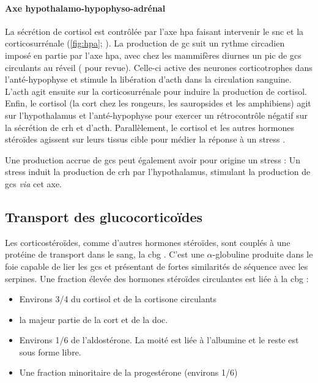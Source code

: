 \documentclass[../main.tex]{subfiles}
\begin{document}
\paragraph[Axe hypothalamo-hypophyso-adrénal]{Axe hypothalamo-hypophyso-adrénal}
La sécrétion de cortisol est contrôlée par l'axe \gls{hpa} faisant intervenir le \gls{snc} et la corticosurrénale (\autoref{fig:hpa}; \citealp{Herman1997}).
La production de \gls{gc} suit un rythme circadien imposé en partie par l'axe \gls{hpa}, avec chez les mammifères diurnes un pic de \glspl{gc} circulants au réveil (\citealp{Dickmeis2009} pour revue).
Celle-ci active des neurones corticotrophes dans l'anté-hypophyse et stimule la libération d'\gls{acth} dans la circulation sanguine.
L'\gls{acth} agit ensuite sur la corticosurrénale pour induire la production de cortisol.
Enfin, le cortisol (la \gls{cort} chez les rongeurs, les sauropsides et les amphibiens) agit sur l'hypothalamus et l'anté-hypophyse pour exercer un rétrocontrôle négatif sur la sécrétion de \gls{crh} et d'\gls{acth}.
Parallèlement, le cortisol et les autres hormones stéroïdes agissent sur leurs tissus cible pour médier la réponse à un stress \citep{Herman1997,Tsigos2002}.
\par
Une production accrue de \glspl{gc} peut également avoir pour origine un stress :
Un stress induit la production de \gls{crh} par l'hypothalamus, stimulant la production de \glspl{gc} \textit{via} cet axe.




\subsection{Transport des glucocorticoïdes}
Les corticostéroïdes, comme d'autres hormones stéroïdes, sont couplés à une protéine de transport dans le sang, la \gls{cbg} \citep{Rosner1990}.
C'est une $\alpha$-globuline produite dans le foie capable de lier les \glspl{gc} et présentant de fortes similarités de séquence avec les serpines.
Une fraction élevée des hormones stéroïdes circulantes est liée à la \gls{cbg} \citep{Bittar1997,Becker2001}:
\begin{itemize}
\item Environs 3/4 du cortisol et de la cortisone circulants
\item la majeur partie de la \gls{cort} et de la \gls{doc}.
\item Environs 1/6 de l'aldostérone. La moité est liée à l'albumine et le reste est sous forme libre.
\item Une fraction minoritaire de la progestérone (environs 1/6)
\end{itemize}
\end{document}
